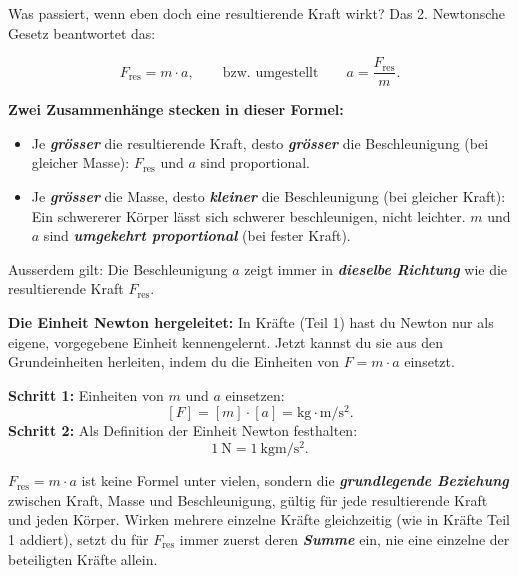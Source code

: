 \documentclass[addpoints,11pt,a4paper]{exam}
\begin{document}
\begin{theoriebox}
Was passiert, wenn eben doch eine resultierende Kraft wirkt? Das 2.
Newtonsche Gesetz beantwortet das:

\begin{merksatzbox}
\[
  F_{\text{res}} = m\cdot a, \qquad \text{bzw. umgestellt} \qquad
  a = \frac{F_{\text{res}}}{m}.
\]
\end{merksatzbox}

\textbf{Zwei Zusammenhänge stecken in dieser Formel:}
\begin{itemize}[leftmargin=1.2cm,itemsep=0.25em]
  \item Je \textbf{\emph{grösser}} die resultierende Kraft, desto
  \textbf{\emph{grösser}} die Beschleunigung (bei gleicher Masse):
  $F_{\text{res}}$ und $a$ sind proportional.
  \item Je \textbf{\emph{grösser}} die Masse, desto \textbf{\emph{kleiner}}
  die Beschleunigung (bei gleicher Kraft): Ein schwererer Körper lässt
  sich schwerer beschleunigen, nicht leichter. $m$ und $a$ sind
  \textbf{\emph{umgekehrt proportional}} (bei fester Kraft).
\end{itemize}

Ausserdem gilt: Die Beschleunigung $a$ zeigt immer in \textbf{\emph{dieselbe
Richtung}} wie die resultierende Kraft $F_{\text{res}}$.

\textbf{Die Einheit Newton hergeleitet:} In Kräfte (Teil 1) hast du
Newton nur als eigene, vorgegebene Einheit kennengelernt. Jetzt kannst du
sie aus den Grundeinheiten herleiten, indem du die Einheiten von
$F=m\cdot a$ einsetzt.

\textbf{Schritt 1:} Einheiten von $m$ und $a$ einsetzen:
\[
  [F] = [m]\cdot[a] = \si{\kilo\gram}\cdot\si{\meter\per\second\squared}.
\]
\textbf{Schritt 2:} Als Definition der Einheit Newton festhalten:
\[
  \boxed{\SI{1}{\newton} = \SI{1}{\kilo\gram\meter\per\second\squared}}.
\]
\end{theoriebox}

\begin{hinweisbox}
$F_{\text{res}}=m\cdot a$ ist keine Formel unter vielen, sondern die
\textbf{\emph{grundlegende Beziehung}} zwischen Kraft, Masse und
Beschleunigung, gültig für jede resultierende Kraft und jeden Körper.
Wirken mehrere einzelne Kräfte gleichzeitig (wie in Kräfte Teil 1
addiert), setzt du für $F_{\text{res}}$ immer zuerst deren
\textbf{\emph{Summe}} ein, nie eine einzelne der beteiligten Kräfte
allein.
\end{hinweisbox}
\end{document}
